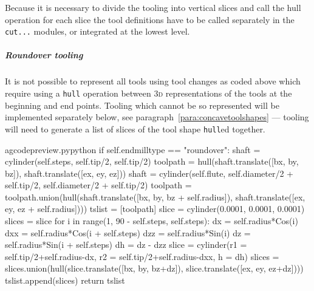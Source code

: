 \documentclass{ltxdoc}
\begin{document}
Because it is necessary to divide the tooling into vertical slices and call the hull operation for each slice the tool definitions have to be called separately in the \verb|cut...| modules, or integrated at the lowest level.

\subparagraph{Roundover tooling}

\label{para:roundover} It is not possible to represent all tools using tool changes as coded above which require using a \texttt{hull} operation between \textsc{3d} representations of the tools at the beginning and end points. Tooling which cannot be so represented will be implemented separately below, see paragraph~\ref{para:concavetoolshapes} ---  tooling will need to generate a list of slices of the tool shape \verb|hull|ed together.

\lstset{firstnumber=\thegcpy}
\begin{writecode}{a}{gcodepreview.py}{python}
        if self.endmilltype == "roundover":
            shaft = cylinder(self.steps, self.tip/2, self.tip/2)
            toolpath = hull(shaft.translate([bx, by, bz]), shaft.translate([ex, ey, ez]))
            shaft = cylinder(self.flute, self.diameter/2 + self.tip/2, self.diameter/2 + self.tip/2)
            toolpath = toolpath.union(hull(shaft.translate([bx, by, bz + self.radius]), shaft.translate([ex, ey, ez + self.radius])))
            tslist = [toolpath]
            slice = cylinder(0.0001, 0.0001, 0.0001)
            slices = slice
            for i in range(1, 90 - self.steps, self.steps):
                dx = self.radius*Cos(i)
                dxx = self.radius*Cos(i + self.steps)
                dzz = self.radius*Sin(i)
                dz = self.radius*Sin(i + self.steps)
                dh = dz - dzz
                slice = cylinder(r1 = self.tip/2+self.radius-dx, r2 = self.tip/2+self.radius-dxx, h = dh)
                slices = slices.union(hull(slice.translate([bx, by, bz+dz]), slice.translate([ex, ey, ez+dz])))
                tslist.append(slices)
            return tslist

\end{writecode}
\addtocounter{gcpy}{19}

%
%
%
\end{document}
